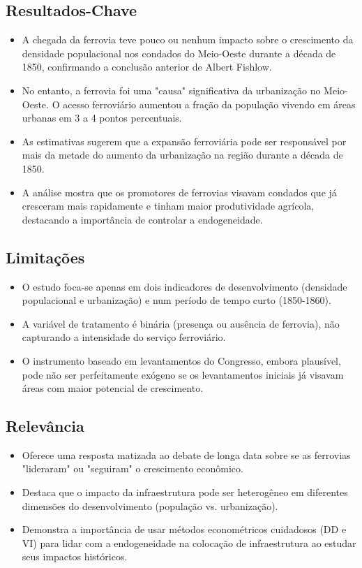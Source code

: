 \documentclass[12pt]{article}
\begin{document}
\subsection*{Resultados-Chave}
\begin{itemize}
    \item A chegada da ferrovia teve pouco ou nenhum impacto sobre o crescimento da densidade populacional nos condados do Meio-Oeste durante a década de 1850, confirmando a conclusão anterior de Albert Fishlow.
    \item No entanto, a ferrovia foi uma "causa" significativa da urbanização no Meio-Oeste. O acesso ferroviário aumentou a fração da população vivendo em áreas urbanas em 3 a 4 pontos percentuais.
    \item As estimativas sugerem que a expansão ferroviária pode ser responsável por mais da metade do aumento da urbanização na região durante a década de 1850.
    \item A análise mostra que os promotores de ferrovias visavam condados que já cresceram mais rapidamente e tinham maior produtividade agrícola, destacando a importância de controlar a endogeneidade.
\end{itemize}

\subsection*{Limitações}
\begin{itemize}
    \item O estudo foca-se apenas em dois indicadores de desenvolvimento (densidade populacional e urbanização) e num período de tempo curto (1850-1860).
    \item A variável de tratamento é binária (presença ou ausência de ferrovia), não capturando a intensidade do serviço ferroviário.
    \item O instrumento baseado em levantamentos do Congresso, embora plausível, pode não ser perfeitamente exógeno se os levantamentos iniciais já visavam áreas com maior potencial de crescimento.
\end{itemize}

\subsection*{Relevância}
\begin{itemize}
    \item Oferece uma resposta matizada ao debate de longa data sobre se as ferrovias "lideraram" ou "seguiram" o crescimento econômico.
    \item Destaca que o impacto da infraestrutura pode ser heterogêneo em diferentes dimensões do desenvolvimento (população vs. urbanização).
    \item Demonstra a importância de usar métodos econométricos cuidadosos (DD e VI) para lidar com a endogeneidade na colocação de infraestrutura ao estudar seus impactos históricos.
\end{itemize}
\newpage
\end{document}
